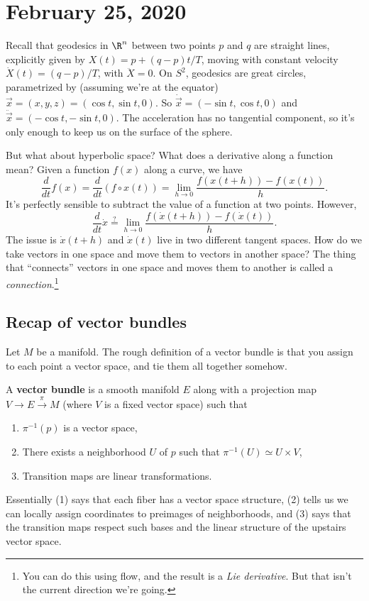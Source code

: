 \section{February 25, 2020} 
Recall that geodesics in $\R^n $ between two points $p$ and $q$ are straight lines, explicitly given by $X(t)=p+(q-p)t /T$, moving with constant velocity $\dot X(t)=(q-p) /T$, with $\ddot X=0$. On $S^2 $, geodesics are great circles, parametrized by (assuming we're at the equator) $\vec x=(x,y,z)=(\cos t, \sin t, 0)$. So $\dot{\vec x} =(- \sin t, \cos t, 0)$ and $\ddot{\vec x} =(-\cos t, -\sin t,0)$. The acceleration has no tangential component, so it's only enough to keep us on the surface of the sphere. 

But what about hyperbolic space? What does a derivative along a function mean? Given a function $f(x)$ along a curve, we have \[
    \frac{d}{dt}f(x)=\frac{d}{dt}(f \circ x(t))= \lim _{h\to 0}\frac{f(x(t+h))-f(x(t))}{h}.
\] It's perfectly sensible to subtract the value of a function at two points. However, \[
\frac{d}{dt}\dot x \overset{?}{=} \lim _{h\to 0}\frac{f(\dot x(t+h))-f(\dot x(t))}{h}.
\] The issue is $\dot x(t+h)$ and $\dot x(t)$ live in two different tangent spaces. How do we take vectors in one space and move them to vectors in another space? The thing that ``connects'' vectors in one space and moves them to another is called a \emph{connection}.\footnote{You can do this using flow, and the result is a \emph{Lie derivative}. But that isn't the current direction we're going.}

\subsection{Recap of vector bundles}
Let $M$ be a manifold. The rough definition of a vector bundle is that you assign to each point a vector space, and tie them all together somehow. 
\begin{definition}[]
    A \textbf{vector bundle} is a smooth manifold $E$ along with a projection map $V \to E \overset{\pi}{\to } M$ (where $V$ is a fixed vector space) such that
    \begin{enumerate}[label=(\arabic*)]
        \item $\pi ^{-1}(p)$ is a vector space,
        \item There exists a neighborhood $U$ of $p$ such that $\pi ^{-1}(U) \simeq U \times V$,
        \item Transition maps are linear transformations.
    \end{enumerate}
\end{definition}
Essentially (1) says that each fiber has a vector space structure, (2) tells us we can locally assign coordinates to preimages of neighborhoods, and (3) says that the transition maps respect such bases and the linear structure of the upstairs vector space.

